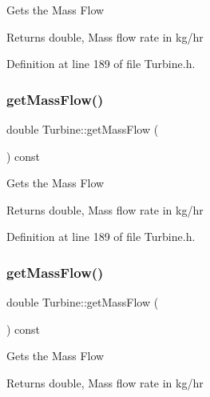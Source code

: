 Gets the Mass Flow

\begin{DoxyReturn}{Returns}
double, Mass flow rate in kg/hr 
\end{DoxyReturn}


Definition at line 189 of file Turbine.\+h.

\mbox{\label{class_turbine_a4893a203dbbf9db9ca77a0b278c4c118}} 
\subsubsection{\texorpdfstring{get\+Mass\+Flow()}{getMassFlow()}\hspace{0.1cm}{\footnotesize\ttfamily [2/3]}}
{\footnotesize\ttfamily double Turbine\+::get\+Mass\+Flow (\begin{DoxyParamCaption}{ }\end{DoxyParamCaption}) const\hspace{0.3cm}{\ttfamily [inline]}}

Gets the Mass Flow

\begin{DoxyReturn}{Returns}
double, Mass flow rate in kg/hr 
\end{DoxyReturn}


Definition at line 189 of file Turbine.\+h.

\mbox{\label{class_turbine_a4893a203dbbf9db9ca77a0b278c4c118}} 
\subsubsection{\texorpdfstring{get\+Mass\+Flow()}{getMassFlow()}\hspace{0.1cm}{\footnotesize\ttfamily [3/3]}}
{\footnotesize\ttfamily double Turbine\+::get\+Mass\+Flow (\begin{DoxyParamCaption}{ }\end{DoxyParamCaption}) const\hspace{0.3cm}{\ttfamily [inline]}}

Gets the Mass Flow

\begin{DoxyReturn}{Returns}
double, Mass flow rate in kg/hr 
\end{DoxyReturn}


